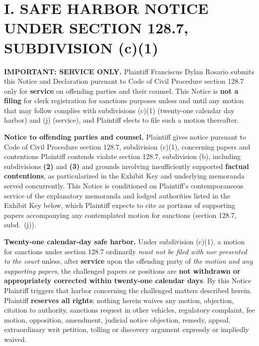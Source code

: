 \newcommand{\docshorttitle}{SAFE HARBOR + DECL.\ --- CCP \textsection 128.7(c)(1) (CGC-25-631801)}
\newcommand{\doctitleblock}{NOTICE UNDER CODE OF CIVIL PROCEDURE SECTION 128.7, SUBDIVISION (c)(1), AND DECLARATION OF PLAINTIFF}
\newcommand{\docsubblock}{(Serve on defendants and defense counsel identified on the preceding caption; \textbf{not for filing with the Clerk} until subdiv.\ (c)(1) prerequisites are satisfied absent withdrawal/correction of challenged papers)}




\section*{I. SAFE HARBOR NOTICE UNDER SECTION 128.7, SUBDIVISION (c)(1)}

\textbf{IMPORTANT: SERVICE ONLY.} Plaintiff Franciscus Dylan Rosario submits this Notice and Declaration pursuant to Code of Civil Procedure section 128.7 only for \textbf{service} on offending parties and their counsel. This Notice is \textbf{not a filing} for clerk registration for sanctions purposes unless and until any motion that may follow complies with subdivisions (c)(1) (twenty-one calendar day harbor) and (j) (service), and Plaintiff elects to file such a motion thereafter.

\textbf{Notice to offending parties and counsel.} Plaintiff gives notice pursuant to Code of Civil Procedure section 128.7, subdivision (c)(1), concerning papers and contentions Plaintiff contends violate section 128.7, subdivision (b), including subdivisions \textbf{(2)} and \textbf{(3)} and grounds involving insufficiently supported \textbf{factual contentions}, as particularized in the Exhibit Key and underlying memoranda served concurrently. This Notice is conditioned on Plaintiff's contemporaneous service of the explanatory memoranda and lodged authorities listed in the Exhibit Key below, which Plaintiff expects to cite as portions of supporting papers accompanying any contemplated motion for sanctions (section 128.7, subd.\ (j)).

\textbf{Twenty-one calendar-day safe harbor.} Under subdivision (c)(1), a motion for sanctions under section 128.7 ordinarily \textit{must not be filed with nor presented to the court} unless, after \textbf{service} upon the offending party of \textit{the motion and any supporting papers}, the challenged papers or positions are \textbf{not withdrawn or appropriately corrected within twenty-one calendar days}. By this Notice Plaintiff triggers that harbor concerning the challenged matters described herein. Plaintiff \textbf{reserves all rights}; nothing herein waives any motion, objection, citation to authority, sanctions request in other vehicles, regulatory complaint, fee motion, opposition, amendment, judicial notice objection, remedy, appeal, extraordinary writ petition, tolling or discovery argument expressly or impliedly waived.

